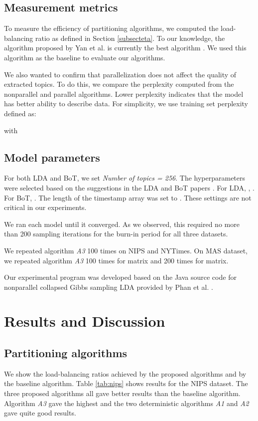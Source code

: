 \documentclass[10pt,conference]{IEEEtran}
\begin{document}
\subsection{Measurement metrics}
To measure the efficiency of partitioning algorithms, we computed the load-balancing ratio  as defined in Section \ref{subsecteta}. To our knowledge, the algorithm proposed by Yan et al. is currently the best algorithm \cite{yan2009parallel}. We used this algorithm as the baseline to evaluate our algorithms.

We also wanted to confirm that parallelization does not affect the quality of extracted topics. To do this, we compare the perplexity computed from the nonparallel and parallel algorithms. Lower perplexity indicates that the model has better ability to describe data. For simplicity, we use training set perplexity defined as:

with


\subsection{Model parameters}
For both LDA and BoT, we set \textit{Number of topics = 256}. The hyperparameters were selected based on the suggestions in the LDA and BoT papers \cite{blei2003latent, masada2009bag}. For LDA, , . For BoT, . The length of the timestamp array was set to . These settings are not critical in our experiments.

We ran each model until it converged. As we observed, this required no more than 200 sampling iterations for the burn-in period for all three datasets.

We repeated algorithm \textit{A3} 100 times on NIPS and NYTimes. On MAS dataset, we repeated algorithm \textit{A3} 100 times for  matrix and 200 times for  matrix.

Our experimental program was developed based on the Java source code for nonparallel collapsed Gibbs sampling LDA provided by Phan et al. \cite{phan2008learning}.

\section{Results and Discussion}
\subsection{Partitioning algorithms }
We show the load-balancing ratios  achieved by the proposed algorithms and by the baseline algorithm. Table \ref{tab:nips} shows results for the NIPS dataset. The three proposed algorithms all gave better results than the baseline algorithm. Algorithm \textit{A3} gave the highest  and the two deterministic algorithms \textit{A1} and \textit{A2} gave quite good results.
\end{document}
